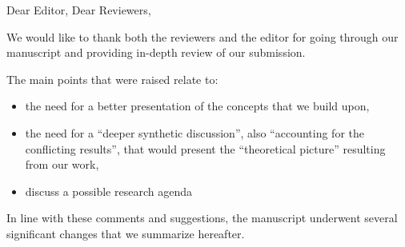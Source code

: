 \documentclass{article}
\begin{document}
Dear Editor, Dear Reviewers,

\vspace{2em}

We would like to thank both the reviewers and the editor for going through our
manuscript and providing in-depth review of our submission.

The main points that were raised relate to:
\begin{itemize}
    \item the need for a better presentation of the concepts that we build upon,
    \item the need for a ``deeper synthetic discussion'', also ``accounting for the
        conflicting results'', that would present the ``theoretical
        picture'' resulting from our work,
    \item discuss a possible research agenda
\end{itemize}

In line with these comments and suggestions, the manuscript underwent several
significant changes that we summarize hereafter.
\end{document}

